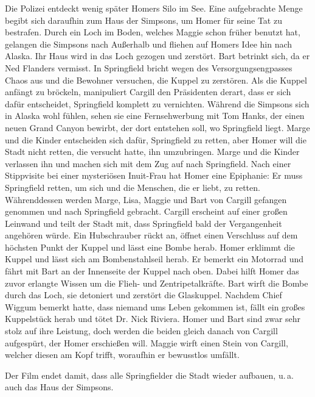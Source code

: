 \begin{appendix}
Die Polizei entdeckt wenig später Homers Silo im See. Eine aufgebrachte Menge begibt sich daraufhin zum Haus der Simpsons, um Homer für seine Tat zu bestrafen. Durch ein Loch im Boden, welches Maggie schon früher benutzt hat, gelangen die Simpsons nach Außerhalb und fliehen auf Homers Idee hin nach Alaska. Ihr Haus wird in das Loch gezogen und zerstört. Bart betrinkt sich, da er Ned Flanders vermisst. In Springfield bricht wegen des Versorgungsengpasses Chaos aus und die Bewohner versuchen, die Kuppel zu zerstören. Als die Kuppel anfängt zu bröckeln, manipuliert Cargill den Präsidenten derart, dass er sich dafür entscheidet, Springfield komplett zu vernichten. Während die Simpsons sich in Alaska wohl fühlen, sehen sie eine Fernsehwerbung mit Tom Hanks, der einen neuen Grand Canyon bewirbt, der dort entstehen soll, wo Springfield liegt. Marge und die Kinder entscheiden sich dafür, Springfield zu retten, aber Homer will die Stadt nicht retten, die versucht hatte, ihn umzubringen. Marge und die Kinder verlassen ihn und machen sich mit dem Zug auf nach Springfield. Nach einer Stippvisite bei einer mysteriösen Inuit-Frau hat Homer eine Epiphanie: Er muss Springfield retten, um sich und die Menschen, die er liebt, zu retten. Währenddessen werden Marge, Lisa, Maggie und Bart von Cargill gefangen genommen und nach Springfield gebracht. Cargill erscheint auf einer großen Leinwand und teilt der Stadt mit, dass Springfield bald der Vergangenheit angehören würde. Ein Hubschrauber rückt an, öffnet einen Verschluss auf dem höchsten Punkt der Kuppel und lässt eine Bombe herab. Homer erklimmt die Kuppel und lässt sich am Bombenstahlseil herab. Er bemerkt ein Motorrad und fährt mit Bart an der Innenseite der Kuppel nach oben. Dabei hilft Homer das zuvor erlangte Wissen um die Flieh- und Zentripetalkräfte. Bart wirft die Bombe durch das Loch, sie detoniert und zerstört die Glaskuppel. Nachdem Chief Wiggum bemerkt hatte, dass niemand ums Leben gekommen ist, fällt ein großes Kuppelstück herab und tötet Dr. Nick Riviera. Homer und Bart sind zwar sehr stolz auf ihre Leistung, doch werden die beiden gleich danach von Cargill aufgespürt, der Homer erschießen will. Maggie wirft einen Stein von Cargill, welcher diesen am Kopf trifft, woraufhin er bewusstlos umfällt.

Der Film endet damit, dass alle Springfielder die Stadt wieder aufbauen, u.\,a. auch das Haus der Simpsons.




\end{appendix}
